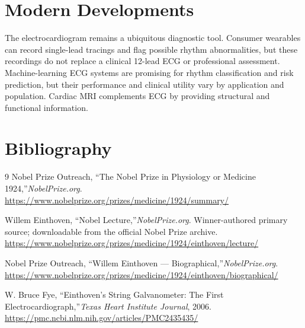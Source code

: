 \section{Modern Developments}

The electrocardiogram remains a ubiquitous diagnostic tool. Consumer wearables can record single-lead tracings and flag possible rhythm abnormalities, but these recordings do not replace a clinical 12-lead ECG or professional assessment. Machine-learning ECG systems are promising for rhythm classification and risk prediction, but their performance and clinical utility vary by application and population. Cardiac MRI complements ECG by providing structural and functional information.


\section{Bibliography}

\begin{thebibliography}{9}
Nobel Prize Outreach, ``The Nobel Prize in Physiology or Medicine 1924,''\emph{NobelPrize.org}.\\
\url{https://www.nobelprize.org/prizes/medicine/1924/summary/}

Willem Einthoven, ``Nobel Lecture,''\emph{NobelPrize.org}. Winner-authored primary source; downloadable from the official Nobel Prize archive.\\
\url{https://www.nobelprize.org/prizes/medicine/1924/einthoven/lecture/}

Nobel Prize Outreach, ``Willem Einthoven --- Biographical,''\emph{NobelPrize.org}.\\
\url{https://www.nobelprize.org/prizes/medicine/1924/einthoven/biographical/}

W. Bruce Fye, ``Einthoven's String Galvanometer: The First Electrocardiograph,''\emph{Texas Heart Institute Journal}, 2006.\\
\url{https://pmc.ncbi.nlm.nih.gov/articles/PMC2435435/}
\end{thebibliography}
